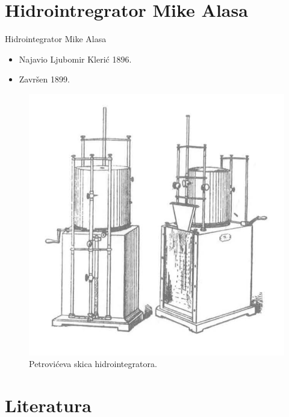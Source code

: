 \documentclass[14pt]{beamer}
\begin{document}
\section{Hidrointregrator Mike Alasa}
\begin{frame}{Hidrointegrator Mike Alasa}
\begin{itemize}
    \item Najavio Ljubomir Klerić 1896.
    \item Završen 1899.
\end{itemize}
\begin{figure}[h!]
\begin{center}
\includegraphics[scale=0.6]{h1.jpg}
\end{center}
\caption{Petrovićeva skica hidrointegratora. }
\label{fig:h1}
\end{figure}
    
\end{frame}


\section{Literatura}
\end{document}
